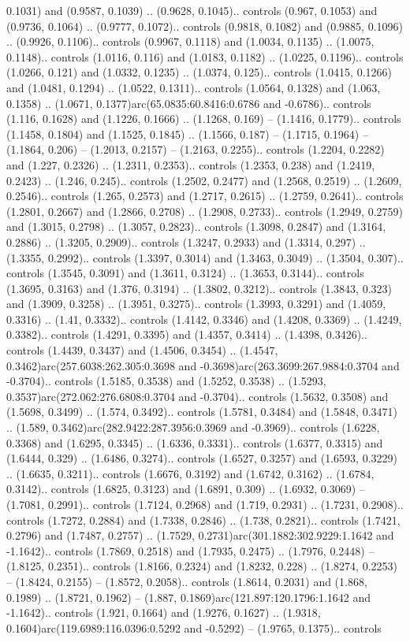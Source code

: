 0.1031) and (0.9587, 0.1039) .. (0.9628, 0.1045).. controls (0.967, 0.1053) and (0.9736, 0.1064) .. (0.9777, 0.1072).. controls (0.9818, 0.1082) and (0.9885, 0.1096) .. (0.9926, 0.1106).. controls (0.9967, 0.1118) and (1.0034, 0.1135) .. (1.0075, 0.1148).. controls (1.0116, 0.116) and (1.0183, 0.1182) .. (1.0225, 0.1196).. controls (1.0266, 0.121) and (1.0332, 0.1235) .. (1.0374, 0.125).. controls (1.0415, 0.1266) and (1.0481, 0.1294) .. (1.0522, 0.1311).. controls (1.0564, 0.1328) and (1.063, 0.1358) .. (1.0671, 0.1377)arc(65.0835:60.8416:0.6786 and -0.6786).. controls (1.116, 0.1628) and (1.1226, 0.1666) .. (1.1268, 0.169) -- (1.1416, 0.1779).. controls (1.1458, 0.1804) and (1.1525, 0.1845) .. (1.1566, 0.187) -- (1.1715, 0.1964) -- (1.1864, 0.206) -- (1.2013, 0.2157) -- (1.2163, 0.2255).. controls (1.2204, 0.2282) and (1.227, 0.2326) .. (1.2311, 0.2353).. controls (1.2353, 0.238) and (1.2419, 0.2423) .. (1.246, 0.245).. controls (1.2502, 0.2477) and (1.2568, 0.2519) .. (1.2609, 0.2546).. controls (1.265, 0.2573) and (1.2717, 0.2615) .. (1.2759, 0.2641).. controls (1.2801, 0.2667) and (1.2866, 0.2708) .. (1.2908, 0.2733).. controls (1.2949, 0.2759) and (1.3015, 0.2798) .. (1.3057, 0.2823).. controls (1.3098, 0.2847) and (1.3164, 0.2886) .. (1.3205, 0.2909).. controls (1.3247, 0.2933) and (1.3314, 0.297) .. (1.3355, 0.2992).. controls (1.3397, 0.3014) and (1.3463, 0.3049) .. (1.3504, 0.307).. controls (1.3545, 0.3091) and (1.3611, 0.3124) .. (1.3653, 0.3144).. controls (1.3695, 0.3163) and (1.376, 0.3194) .. (1.3802, 0.3212).. controls (1.3843, 0.323) and (1.3909, 0.3258) .. (1.3951, 0.3275).. controls (1.3993, 0.3291) and (1.4059, 0.3316) .. (1.41, 0.3332).. controls (1.4142, 0.3346) and (1.4208, 0.3369) .. (1.4249, 0.3382).. controls (1.4291, 0.3395) and (1.4357, 0.3414) .. (1.4398, 0.3426).. controls (1.4439, 0.3437) and (1.4506, 0.3454) .. (1.4547, 0.3462)arc(257.6038:262.305:0.3698 and -0.3698)arc(263.3699:267.9884:0.3704 and -0.3704).. controls (1.5185, 0.3538) and (1.5252, 0.3538) .. (1.5293, 0.3537)arc(272.062:276.6808:0.3704 and -0.3704).. controls (1.5632, 0.3508) and (1.5698, 0.3499) .. (1.574, 0.3492).. controls (1.5781, 0.3484) and (1.5848, 0.3471) .. (1.589, 0.3462)arc(282.9422:287.3956:0.3969 and -0.3969).. controls (1.6228, 0.3368) and (1.6295, 0.3345) .. (1.6336, 0.3331).. controls (1.6377, 0.3315) and (1.6444, 0.329) .. (1.6486, 0.3274).. controls (1.6527, 0.3257) and (1.6593, 0.3229) .. (1.6635, 0.3211).. controls (1.6676, 0.3192) and (1.6742, 0.3162) .. (1.6784, 0.3142).. controls (1.6825, 0.3123) and (1.6891, 0.309) .. (1.6932, 0.3069) -- (1.7081, 0.2991).. controls (1.7124, 0.2968) and (1.719, 0.2931) .. (1.7231, 0.2908).. controls (1.7272, 0.2884) and (1.7338, 0.2846) .. (1.738, 0.2821).. controls (1.7421, 0.2796) and (1.7487, 0.2757) .. (1.7529, 0.2731)arc(301.1882:302.9229:1.1642 and -1.1642).. controls (1.7869, 0.2518) and (1.7935, 0.2475) .. (1.7976, 0.2448) -- (1.8125, 0.2351).. controls (1.8166, 0.2324) and (1.8232, 0.228) .. (1.8274, 0.2253) -- (1.8424, 0.2155) -- (1.8572, 0.2058).. controls (1.8614, 0.2031) and (1.868, 0.1989) .. (1.8721, 0.1962) -- (1.887, 0.1869)arc(121.897:120.1796:1.1642 and -1.1642).. controls (1.921, 0.1664) and (1.9276, 0.1627) .. (1.9318, 0.1604)arc(119.6989:116.0396:0.5292 and -0.5292) -- (1.9765, 0.1375).. controls 